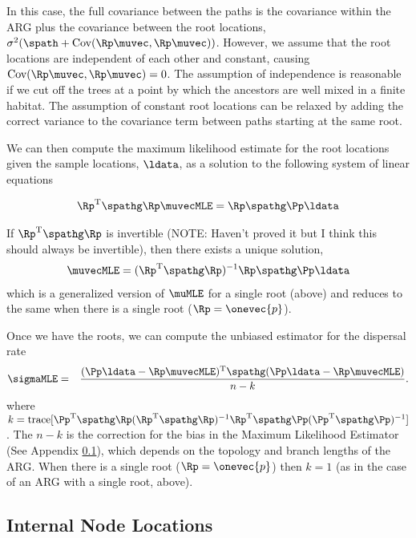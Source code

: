 In this case, the full covariance between the paths is the covariance within the ARG plus the covariance between the root locations, $\sigma^2 ( \spath + \text{Cov}(\Rp\muvec, \Rp\muvec)) $. However, we assume that the root locations are independent of each other and constant, causing $\text{Cov}(\Rp\muvec, \Rp\muvec)=0$. The assumption of independence is reasonable if we cut off the trees at a point by which the ancestors are well mixed in a finite habitat. The assumption of constant root locations can be relaxed by adding the correct variance to the covariance term between paths starting at the same root. 

We can then compute the maximum likelihood estimate for the root locations given the sample locations, $\ldata$, as a solution to the following system of linear equations

\begin{eqnarray}
    \label{eq:location_of_roots}
    \Rp^\text{T}\spathg\Rp  \muvecMLE = \Rp\spathg\Pp\ldata  
\end{eqnarray}

If $\Rp^\text{T}\spathg\Rp$ is invertible (NOTE: Haven't proved it but I think this should always be invertible), then there exists a unique solution,
\begin{eqnarray}
 \muvecMLE = (\Rp^\text{T}\spathg\Rp)^{-1} \Rp\spathg\Pp\ldata   
\end{eqnarray}
which is a generalized version of $\muMLE$ for a single root (above) and reduces to the same when there is a single root ($\Rp = \onevec{p}$).

Once we have the roots, we can compute the unbiased estimator for the dispersal rate 
\begin{eqnarray}
    \sigmaMLE &=& \displaystyle \frac{ (\Pp\ldata - \Rp\muvecMLE)^\text{T} \spathg (\Pp\ldata - \Rp\muvecMLE) }{n-k}.
\end{eqnarray}
where $k = \text{trace}[  \Pp^\text{T}\spathg\Rp(\Rp^\text{T}\spathg\Rp)^{-1}\Rp^\text{T}\spathg\Pp(\Pp^\text{T}\spathg\Pp)^{-1} ]$ . The $n-k$ is the correction for the bias in the Maximum Likelihood Estimator (See Appendix \ref{}), which depends on the topology and branch lengths of the ARG. When there is a single root ($\Rp = \onevec{p}$) then $k=1$ (as in the case of an ARG with a single root, above).

\subsection{Internal Node Locations}
  

